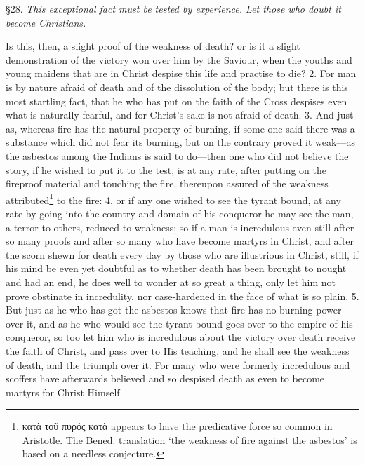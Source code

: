 §28. \emph{This exceptional fact must be tested by experience. Let those who doubt it become Christians.}

Is this, then, a slight proof of the weakness of death? or is it a slight demonstration of the victory won over him by the Saviour, when the youths and young maidens that are in Christ despise this life and practise to die? 2. For man is by nature afraid of death and of the dissolution of the body; but there is this most startling fact, that he who has put on the faith of the Cross despises even what is naturally fearful, and for Christ’s sake is not afraid of death. 3. And just as, whereas fire has the natural property of burning, if some one said there was a substance which did not fear its burning, but on the contrary proved it weak—as the asbestos among the Indians is said to do—then one who did not believe the story, if he wished to put it to the test, is at any rate, after putting on the fireproof material and touching the fire, thereupon assured of the weakness attributed\footnote{\textgreek{κατὰ τοῦ πυρός κατὰ} appears to have the predicative force so common in Aristotle. The Bened. translation ‘the weakness of fire against the asbestos’ is based on a needless conjecture.} to the fire: 4. or if any one wished to see the tyrant bound, at any rate by going into the country and domain of his conqueror he may see the man, a terror to others, reduced to weakness; so if a man is incredulous even still after so many proofs and after so many who have become martyrs in Christ, and after the scorn shewn for death every day by those who are illustrious in Christ, still, if his mind be even yet doubtful as to whether death has been brought to nought and had an end, he does well to wonder at so great a thing, only let him not prove obstinate in incredulity, nor case-hardened in the face of what is so plain. 5. But just as he who has got the asbestos knows that fire has no burning power over it, and as he who would see the tyrant bound goes over to the empire of his conqueror, so too let him who is incredulous about the victory over death receive the faith of Christ, and pass over to His teaching, and he shall see the weakness of death, and the triumph over it. For many who were formerly incredulous and scoffers have afterwards believed and so despised death as even to become martyrs for Christ Himself.


